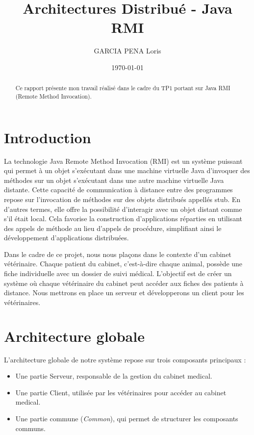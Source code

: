 \documentclass{article} %
\title{Architectures Distribué - Java RMI}
\author{GARCIA PENA Loris}
\date{\today} %
\begin{document}

\maketitle %

\begin{abstract}
    Ce rapport présente mon travail réalisé dans le cadre du TP1 portant sur Java RMI (Remote Method Invocation).
\end{abstract}

\tableofcontents

\newpage %

\section{Introduction}

La technologie Java Remote Method Invocation (RMI) est un système puissant qui permet à un objet s'exécutant dans une machine virtuelle
Java d'invoquer des méthodes sur un objet s'exécutant dans une autre machine virtuelle Java distante. Cette capacité de communication à distance
entre des programmes repose sur l'invocation de méthodes sur des objets distribués appellés stub.
En d'autres termes, elle offre la possibilité d'interagir avec un objet distant comme s'il était local.
Cela favorise la construction d'applications réparties en utilisant des appels de méthode au lieu d'appels de procédure,
simplifiant ainsi le développement d'applications distribuées.

Dans le cadre de ce projet, nous nous plaçons dans le contexte d'un cabinet vétérinaire.
Chaque patient du cabinet, c'est-à-dire chaque animal, possède une fiche individuelle avec un dossier de suivi médical.
L'objectif est de créer un système où chaque vétérinaire du cabinet peut accéder aux fiches des patients à distance.
Nous mettrons en place un serveur et développerons un client pour les vétérinaires.

\newpage
\section{Architecture globale}

L'architecture globale de notre système repose sur trois composants principaux :
\begin{itemize}
    \item Une partie Serveur, responsable de la gestion du cabinet medical.
    \item Une partie Client, utilisée par les vétérinaires pour accéder au cabinet medical.
    \item Une partie commune (\textit{Common}), qui permet de structurer les composants communs.
\end{itemize}
\end{document}
